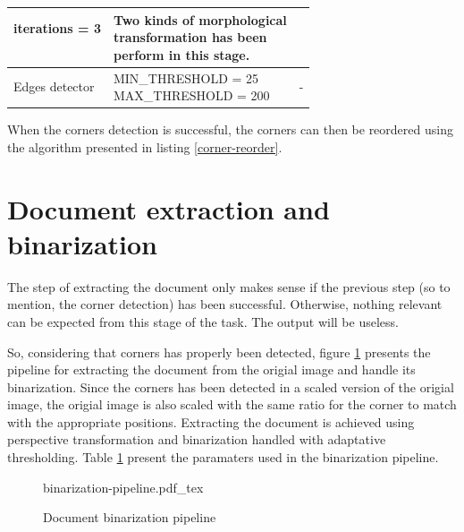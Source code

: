 \documentclass{scrartcl}
\newcommand{\param}[1]{{\ttfamily\footnotesize{#1}}}
\newcommand{\fig}[3][100]{
  \def\svgwidth{#1mm}
  {#3.pdf_tex}
}
\begin{document}
\begin{table}[htbp]
\begin{tabular}{ | l | l | l |}
{            \param{iterations = 3} \\
            \\
          }
        &
        \makecell[l] {
          Two kinds of morphological \\
          transformation has been \\
          perform in this stage.
        }
      \\
      \hline
        Edges detector
        &
        \makecell[l]{
          \param{MIN\_THRESHOLD = 25} \\
          \param{MAX\_THRESHOLD = 200}
        }
        &
        -
      \\
      \hline
    \end{tabular}
    \label{table:corner-detection-pipeline-params}
  \end{table}

  When the corners detection is successful, the corners can then be reordered using the
  algorithm presented in listing \ref{corner-reorder}.

  \section{Document extraction and binarization}
  \label{ss:doc-binarization}

  The step of extracting the document only makes sense if the previous step (so to mention,
  the corner detection) has been successful. Otherwise, nothing relevant can be expected
  from this stage of the task. The output will be useless.

  So, considering that corners has properly been detected, figure
  \ref{figure:scanner-doc-extraction-pipeline-overview} presents the pipeline for extracting
  the document from the origial image and handle its binarization. Since the corners has been
  detected in a scaled version of the origial image, the origial image is also scaled with the
  same ratio for the corner to match with the appropriate positions. Extracting the document is
  achieved using perspective transformation and binarization handled with adaptative thresholding.
  Table \ref{table:corner-detection-pipeline-params} present the paramaters used in the
  binarization pipeline.

  \begin{figure}[!htbp]
    \centering
    \fig{pictures/binarization-pipeline}{binarization-pipeline}
    \caption{Document binarization pipeline}
    \label{figure:scanner-doc-extraction-pipeline-overview}
  \end{figure}
\end{document}
